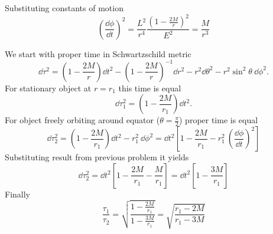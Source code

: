 %
Substituting constants of motion
%
\begin{equation}
    \boxed{\left(\frac{\dd \phi}{\dd t}\right)^2 =
        \frac{L^2}{r^4}
        \frac{\left(1-\frac{2M}{r}\right)^2}{E^2} =
        \frac{M}{r^3}}
\end{equation}
%
%

\problem

We start with proper time in Schwartzschild metric
%
\begin{equation}
    \dd \tau^2 = \left(1-\frac{2M}{r}\right) \dd t^2 -
    \left(1-\frac{2M}{r}\right)^{-1} \dd r^2 -
    r^2 \dd \theta^2 -
    r^2 \sin^2\theta~ \dd \phi ^2.
\end{equation}
%
For stationary object at $r=r_1$ this time is equal
%
\begin{equation}
    \dd \tau_1^2 = \left(1-\frac{2M}{r_1}\right) \dd t^2.
\end{equation}
%
For object freely orbiting around equator ($\theta = \frac{\pi}{2}$) proper time
is equal
%
\begin{equation}
    \dd \tau_2^2 = \left(1-\frac{2M}{r_1}\right) \dd t^2 -
    r_1^2 ~\dd \phi^2 =
    \dd t^2 \left[1-\frac{2M}{r_1}  -
        r_1^2 ~ \left(\frac{\dd \phi}{\dd t}\right)^2\right]
\end{equation}
%
Substituting result from previous problem it yields
%
\begin{equation}
    \dd \tau_2^2 =
    \dd t^2 \left[1-\frac{2M}{r_1}  -
        \frac{M}{r_1}\right]=
    \dd t^2 \left[1-\frac{3M}{r_1}\right]
\end{equation}
%
Finally
%
\begin{equation}
    \boxed{\frac{\tau_1}{\tau_2} =
        \sqrt{\frac{1-\frac{2M}{r_1}}{1-\frac{3M}{r_1}}} =
        \sqrt{\frac{r_1-2M}{r_1-3M}}}
\end{equation}